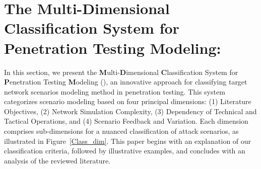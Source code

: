 \section{The Multi-Dimensional Classification System for Penetration Testing Modeling: \modelcla}


In this section, we present the \textbf{M}ulti-\textbf{D}imensional \textbf{C}lassification System for \textbf{P}enetration Testing \textbf{M}odeling (\modelcla), an innovative approach for classifying target network scenarios modeling method in penetration testing. 
This system categorizes scenario modeling based on four principal dimensions: (1) Literature Objectives, (2) Network Simulation Complexity, (3) Dependency of Technical and Tactical Operations, and (4) Scenario Feedback and Variation. Each dimension comprises sub-dimensions for a nuanced classification of attack scenarios, as illustrated in Figure~\ref{Class_dim}. This paper begins with an explanation of our classification criteria, followed by illustrative examples, and concludes with an analysis of the reviewed literature.


